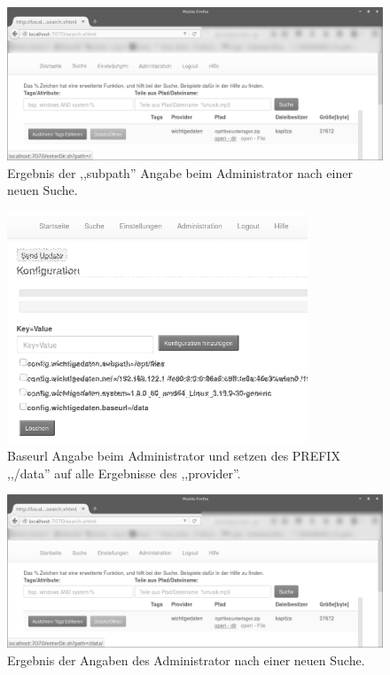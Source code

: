 \documentclass[oneside, ngerman, toc=bibliography,bibliography=totoc,listof=entryprefix, open=right,numbers=noenddot,fontsize=12pt]{scrbook}
\begin{document}
\begin{figure}[htbp] 
    \centering
    \includegraphics[width=\textwidth]{Masterarbeit_Bilder/admin_remove_sub.png}
    \caption{Ergebnis der ,,subpath'' Angabe beim Administrator nach einer neuen Suche.}
    \label{fig:www-subpath_0}
\end{figure}  
\begin{figure}[htbp] 
    \centering
    \includegraphics[width=0.8\textwidth]{Masterarbeit_Bilder/admin_change_mount.png}
    \caption{Baseurl Angabe beim Administrator und setzen des PREFIX ,,/data'' auf alle Ergebnisse des ,,provider''.}
    \label{fig:www-subpath2}
\end{figure}  

\begin{figure}[htbp] 
    \centering
    \includegraphics[width=\textwidth]{Masterarbeit_Bilder/open_mount_dir_0.png}
    \caption{Ergebnis der Angaben des Administrator nach einer neuen Suche.}
    \label{fig:www-erg}
\end{figure}  
\end{document}
